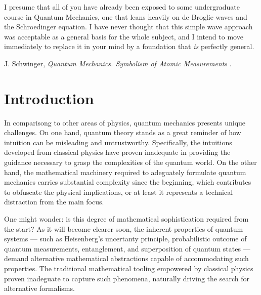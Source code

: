 


\label{chp:fundamentals} 


\begin{refsection}
\begin{quoting}
   \openquote 
   I presume that all of you have already been exposed to some undergraduate
   course in Quantum Mechanics, one that leans heavily on de Broglie waves and
   the Schroedinger equation. I have never thought that this simple wave
   approach was acceptable as a general basis for the whole subject, and I
   intend to move immediately to replace it in your mind by a foundation that
   \emph{is} perfectly general.~\closequote
   \begin{flushright}
       J. Schwinger,
       \emph{Quantum Mechanics. Symbolism of Atomic Measurements}
       \textcite{Schwinger:2001}.
    \end{flushright}
\end{quoting}

\section{Introduction}

In comparisong to other areas of physics, quantum mechanics presents unique challenges.
On one hand, quantum theory stands as a great reminder of how intuition can be misleading and untrustworthy.
 Specifically, the intuitions developed from classical physics have proven inadequate in providing the guidance necessary to grasp the complexities of the quantum world.
  On the other hand, the mathematical machinery required to adeguately formulate quantum mechanics carries substantial complexity since the beginning, which contributes to obfuscate the physical implications, or at least it represents a technical distraction from the main focus. 

  One might wonder: is this degree of mathematical sophistication required from the start?
  As it will become clearer soon, the inherent properties of quantum systems --- 
  such as Heisenberg's uncertanty principle, probabilistic outcome of 
 quantum measurements, entanglement, and superposition of quantum
  states --- demand alternative mathematical abstractions capable of accommodating 
such properties.  The traditional mathematical tooling empowered by classical physics 
  proven inadeguate to 
capture such phenomena, naturally driving the search for alternative formalisms.


\end{refsection}
